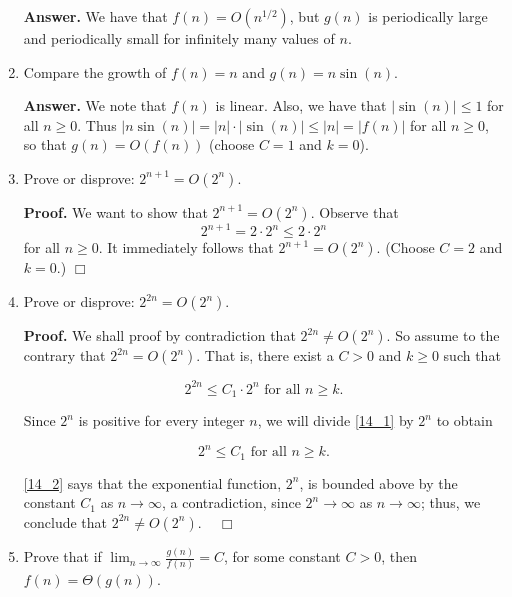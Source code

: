 \documentclass[9pt]{article}
\newcommand{\qed}{\hfill \ensuremath{\Box}}
\begin{document}
\begin{enumerate}
      \textbf{Answer.} We have that $f(n) = O(n^{1/2})$, but $g(n)$ is
      periodically large and periodically small for infinitely many values of
      $n$.
   \item Compare the growth of $f(n) = n$ and $g(n) = n\sin(n)$.

      \textbf{Answer.} We note that $f(n)$ is linear. Also, we have that
      $|\sin(n)| \le 1$ for all $n \ge 0$. Thus
      $|n\sin(n)| = |n| \cdot |\sin(n)| \le |n| = |f(n)|$ for all $n \ge 0$,
      so that $g(n) = O(f(n))$ (choose $C = 1$ and $k = 0$).
   \item Prove or disprove: $2^{n+1} = O(2^n)$.

      \textbf{Proof.} We want to show that $2^{n+1} = O(2^n)$. Observe that
      $$2^{n+1} = 2 \cdot 2^n \le 2 \cdot 2^n$$
      for all $n \ge 0$. It immediately follows that $2^{n+1} = O(2^n)$.
      (Choose $C = 2$ and $k = 0$.) \qed
   \item Prove or disprove: $2^{2n} = O(2^n)$.

      \textbf{Proof.} We shall proof by contradiction that $2^{2n} \neq O(2^n)$.
      So assume to the contrary that $2^{2n} = O(2^n)$. That is, there exist a
      $C > 0$ and $k \ge 0$ such that

      \begin{equation} \label{14_1}
         2^{2n} \le C_1 \cdot 2^n \text{ for all } n \ge k.
      \end{equation}

      Since $2^n$ is positive for every integer $n$, we will divide \eqref{14_1}
      by $2^n$ to obtain

      \begin{equation} \label{14_2}
         2^n \le C_1 \text{ for all } n \ge k.
      \end{equation}

      \eqref{14_2} says that the exponential function, $2^n$, is bounded above
      by the constant $C_1$ as $n \rightarrow \infty$, a contradiction, since
      $2^n \rightarrow \infty$ as $n \rightarrow \infty$; thus, we conclude that
      $2^{2n} \neq O(2^n)$. \mbox{ } \qed
   \item Prove that if $\lim_{n\rightarrow\infty}\frac{g(n)}{f(n)} = C$, for
         some constant $C > 0$, then $f(n) = \Theta(g(n))$.


\end{enumerate}
\end{document}
